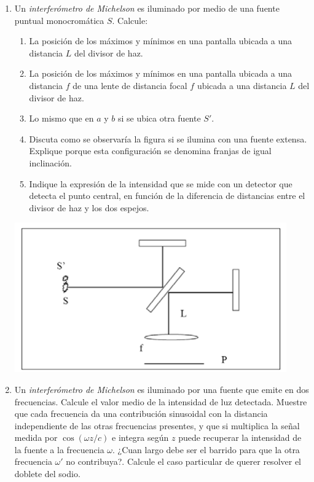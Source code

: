 \documentclass[11pt,spanish,a4paper]{article}
\begin{document}
\begin{enumerate}
\item Un \textit{interferómetro de Michelson} es iluminado por medio de una fuente puntual monocromática \(S \).
	Calcule:
	\begin{enumerate}
		\item La posición de los máximos y mínimos en una pantalla ubicada a una distancia \(L \) del divisor de haz.
		\item La posición de los máximos y mínimos en una pantalla ubicada a una distancia \(f \) de una lente de distancia focal \(f \) ubicada a una distancia \(L \) del divisor de haz.
		\item Lo mismo que en \(a \) y \(b \) si se ubica otra fuente \( S' \).
		\item Discuta como se observaría la figura si se ilumina con una fuente extensa.
			Explique porque esta configuración se denomina franjas de igual inclinación.
		\item Indique la expresión de la intensidad que se mide con un detector que detecta el punto central, en función de la diferencia de distancias entre el divisor de haz y los dos espejos.
	\end{enumerate}
	\begin{center}
		\includegraphics[width=0.3\linewidth]{g09e05}
	\end{center}



\item Un \textit{interferómetro de Michelson} es iluminado por una fuente que emite en dos frecuencias.
	Calcule el valor medio de la intensidad de luz detectada.
	Muestre que cada frecuencia da una contribución sinusoidal con la distancia independiente de las otras frecuencias presentes, y que si multiplica la señal medida por \( \cos{( \omega z/ c)} \) e integra según \(z \) puede recuperar la intensidad de la fuente a la frecuencia \( \omega \).
	¿Cuan largo debe ser el barrido para que la otra frecuencia \( \omega' \) no contribuya?.
	Calcule el caso particular de querer resolver el doblete del sodio.


\end{enumerate}
\end{document}
